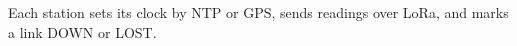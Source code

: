 \documentclass{article}
\begin{document}
Each station sets its clock by NTP or GPS, sends readings over LoRa, and marks a link DOWN or LOST.
\end{document}
